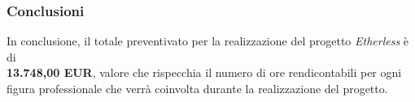 \subsubsection{Conclusioni}
In conclusione, il totale preventivato per la realizzazione del progetto \textit{Etherless} è di\\ \textbf{13.748,00 EUR}, valore che rispecchia il numero di ore rendicontabili per ogni figura professionale che verrà coinvolta durante la realizzazione del progetto.
